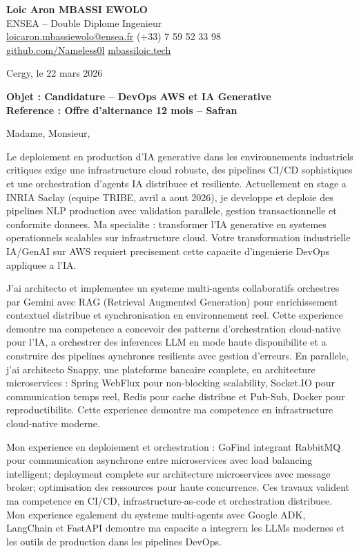 \documentclass[a4paper,11pt]{article}
\begin{document}
\noindent
\textbf{Loic Aron MBASSI EWOLO} \\
ENSEA -- Double Diplome Ingenieur \\
\href{mailto:loicaron.mbassiewolo@ensea.fr}{loicaron.mbassiewolo@ensea.fr} \quad (+33) 7 59 52 33 98 \\
\href{https://github.com/Nameless0l}{github.com/Nameless0l} \quad \href{https://mbassiloic.tech}{mbassiloic.tech}

\vspace{1em}
\noindent
Cergy, le 22 mars 2026

\vspace{1em}
\noindent
\textbf{Objet : Candidature -- DevOps AWS et IA Generative} \\
\textbf{Reference : Offre d'alternance 12 mois -- Safran}

\vspace{1.5em}
\noindent Madame, Monsieur,

Le deploiement en production d'IA generative dans les environnements industriels critiques exige une infrastructure cloud robuste, des pipelines CI/CD sophistiques et une orchestration d'agents IA distribuee et resiliente. Actuellement en stage a INRIA Saclay (equipe TRIBE, avril a aout 2026), je developpe et deploie des pipelines NLP production avec validation parallele, gestion transactionnelle et conformite donnees. Ma specialite : transformer l'IA generative en systemes operationnels scalables sur infrastructure cloud. Votre transformation industrielle IA/GenAI sur AWS requiert precisement cette capacite d'ingenierie DevOps appliquee a l'IA.

J'ai architecto et implementee un systeme multi-agents collaboratifs orchestres par Gemini avec RAG (Retrieval Augmented Generation) pour enrichissement contextuel distribue et synchronisation en environnement reel. Cette experience demontre ma competence a concevoir des patterns d'orchestration cloud-native pour l'IA, a orchestrer des inferences LLM en mode haute disponibilite et a construire des pipelines aynchrones resilients avec gestion d'erreurs. En parallele, j'ai architecto Snappy, une plateforme bancaire complete, en architecture microservices : Spring WebFlux pour non-blocking scalability, Socket.IO pour communication temps reel, Redis pour cache distribue et Pub-Sub, Docker pour reproductibilite. Cette experience demontre ma competence en infrastructure cloud-native moderne.

Mon experience en deploiement et orchestration : GoFind integrant RabbitMQ pour communication asynchrone entre microservices avec load balancing intelligent; deployment complete sur architecture microservices avec message broker; optimisation des ressources pour haute concurrence. Ces travaux valident ma competence en CI/CD, infrastructure-as-code et orchestration distribuee. Mon experience egalement du systeme multi-agents avec Google ADK, LangChain et FastAPI demontre ma capacite a integrern les LLMs modernes et les outils de production dans les pipelines DevOps.
\end{document}
